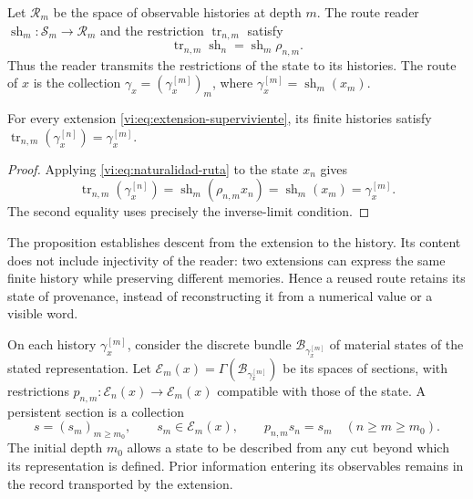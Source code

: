 Let $\mathcal R_m$ be the space of observable histories at depth $m$.
The route reader $\operatorname{sh}_m:\mathcal S_m\to\mathcal R_m$
and the restriction $\operatorname{tr}_{n,m}$ satisfy
\begin{equation}
 \operatorname{tr}_{n,m}\operatorname{sh}_n
 =\operatorname{sh}_m\rho_{n,m}.
 \label{vi:eq:naturalidad-ruta}
\end{equation}
Thus the reader transmits the restrictions of the state to its histories.
The route of $x$ is the collection
$\gamma_x=(\gamma_x^{[m]})_m$, where
$\gamma_x^{[m]}=\operatorname{sh}_m(x_m)$.

\begin{proposition}
\label{vi:prop:historia-compatible}
For every extension \eqref{vi:eq:extension-superviviente}, its finite
histories satisfy
$\operatorname{tr}_{n,m}(\gamma_x^{[n]})=\gamma_x^{[m]}$.
\end{proposition}
\begin{proof}
Applying \eqref{vi:eq:naturalidad-ruta} to the state $x_n$ gives
\[
 \operatorname{tr}_{n,m}(\gamma_x^{[n]})
 =\operatorname{sh}_m(\rho_{n,m}x_n)
 =\operatorname{sh}_m(x_m)=\gamma_x^{[m]}.
\]
The second equality uses precisely the inverse-limit condition.
\end{proof}

The proposition establishes descent from the extension to the history.
Its content does not include injectivity of the reader: two extensions
can express the same finite history while preserving different memories.
Hence a reused route retains its state of provenance,
instead of reconstructing it from a numerical value or a visible word.

On each history $\gamma_x^{[m]}$, consider the discrete bundle
$\mathcal B_{\gamma_x^{[m]}}$ of material states of the stated
representation. Let
$\mathscr E_m(x)=\Gamma(\mathcal B_{\gamma_x^{[m]}})$ be its spaces
of sections, with restrictions
$p_{n,m}:\mathscr E_n(x)\to\mathscr E_m(x)$ compatible with those
of the state. A persistent section is a collection
\begin{equation}
 s=(s_m)_{m\geq m_0},\qquad s_m\in\mathscr E_m(x),\qquad
 p_{n,m}s_n=s_m\quad(n\geq m\geq m_0).
 \label{vi:eq:seccion-persistente}
\end{equation}
The initial depth $m_0$ allows a state to be described from any
cut beyond which its representation is defined. Prior information
entering its observables remains in the record
transported by the extension.

